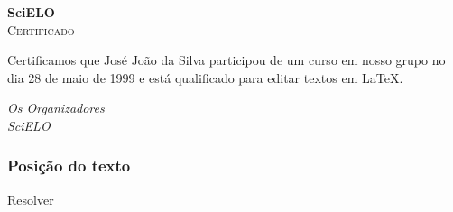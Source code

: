 \begin{frame}[plain]
  \begin{center}
    {\huge\textbf{SciELO}}\\[2em]
    {\LARGE\textsc{Certificado}}
  \end{center}

    \noindent Certificamos que José João da Silva participou de um curso em
    nosso grupo no dia 28 de maio de 1999 e está qualificado para editar textos
    em \LaTeX.

    \vfill
    \begin{flushright}
      \emph{Os Organizadores}\\
      \emph{SciELO}\\
    \end{flushright}
\end{frame}

\begin{frame}
  \frametitle{Posição do texto}
  \huge
  Resolver 
\end{frame}
